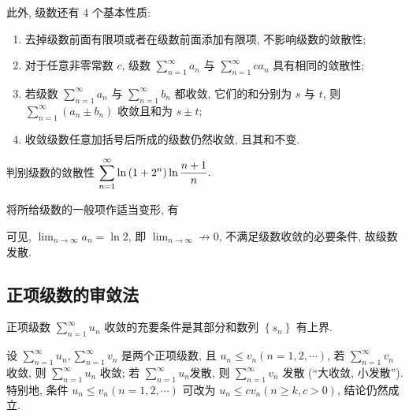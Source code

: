 此外, 级数还有 4 个基本性质:
\begin{enumerate}[label=(\arabic{*})]
    \item 去掉级数前面有限项或者在级数前面添加有限项, 不影响级数的敛散性;
    \item 对于任意非零常数 $c$, 级数 $\displaystyle\sum_{n=1}^{\infty}a_n\text{ 与 }\sum_{n=1}^{\infty}ca_n$ 具有相同的敛散性;
    \item 若级数 $\displaystyle\sum_{n=1}^{\infty}a_n\text{ 与 }\sum_{n=1}^{\infty}b_n$ 都收敛, 它们的和分别为 $s\text{ 与 }t$, 则 $\displaystyle\sum_{n=1}^{\infty}(a_n\pm b_n)$ 收敛且和为 $s\pm t$;
    \item 收敛级数任意加括号后所成的级数仍然收敛, 且其和不变.
\end{enumerate}

\begin{example}
    判别级数的敛散性 $\displaystyle\sum_{n=1}^{\infty}\ln\qty(1+2^n)\ln\dfrac{n+1}{n}.$
\end{example}
\begin{solution}
    将所给级数的一般项作适当变形, 有
    可见, $\displaystyle\lim_{n\to\infty}a_n=\ln 2$, 即 $\displaystyle\lim_{n\to\infty}\not\to0$, 不满足级数收敛的必要条件, 故级数发散.
\end{solution}

\subsection{正项级数的审敛法}

\begin{theorem}[正项级数收敛的充要条件]
    正项级数 $\displaystyle  \sum_{n=1}^{\infty} u_{n} $ 收敛的充要条件是其部分和数列 $ \left\{s_{n}\right\} $ 有上界.
\end{theorem}

\begin{theorem}[比较审敛法]
    设 $\displaystyle  \sum_{n=1}^{\infty} u_{n}, \sum_{n=1}^{\infty} v_{n} $ 是两个正项级数, 且 $ u_{n} \leqslant v_{n}(n=1,2, \cdots) $, 
    若 $\displaystyle  \sum_{n=1}^{\infty} v_{n} $ 收敛, 则 $\displaystyle  \sum_{n=1}^{\infty} u_{n} $ 收敛; 若 $\displaystyle  \sum_{n=1}^{\infty} u_{n}  $发散, 则 $\displaystyle \sum_{n=1}^{\infty} v_{n} $ 发散 (“大收敛, 小发散”).\\
    特别地, 条件 $ u_{n} \leqslant v_{n}(n=1,2, \cdots) $ 可改为 $ u_{n} \leqslant c v_{n}(n \geqslant k, c>0)$, 结论仍然成立.
\end{theorem}

